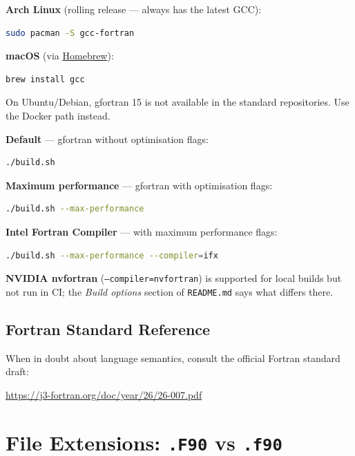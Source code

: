 \documentclass{article}
\begin{document}
\textbf{Arch Linux} (rolling release --- always has the latest GCC):
\begin{lstlisting}[language=bash]
sudo pacman -S gcc-fortran
\end{lstlisting}

\textbf{macOS} (via \href{https://brew.sh}{Homebrew}):
\begin{lstlisting}[language=bash]
brew install gcc
\end{lstlisting}

On Ubuntu/Debian, gfortran 15 is not available in the standard repositories. Use the Docker path instead.

\textbf{Default} --- gfortran without optimisation flags:
\begin{lstlisting}[language=bash]
./build.sh
\end{lstlisting}

\textbf{Maximum performance} --- gfortran with optimisation flags:
\begin{lstlisting}[language=bash]
./build.sh --max-performance
\end{lstlisting}

\textbf{Intel Fortran Compiler} --- with maximum performance flags:
\begin{lstlisting}[language=bash]
./build.sh --max-performance --compiler=ifx
\end{lstlisting}

\textbf{NVIDIA nvfortran} (\texttt{--compiler=nvfortran}) is supported for local builds but not
run in CI; the \emph{Build options} section of \texttt{README.md} says what differs there.

\subsection{Fortran Standard Reference}

When in doubt about language semantics, consult the official Fortran standard draft:
\begin{center}
  \url{https://j3-fortran.org/doc/year/26/26-007.pdf}
\end{center}

\section{File Extensions: \texttt{.F90} vs \texttt{.f90}}
\end{document}
